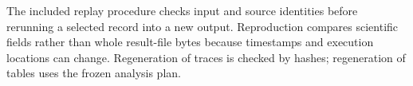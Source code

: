 \documentclass[11pt,a4paper]{article}
\begin{document}
The included replay procedure checks input and source identities before rerunning a selected record into a new output. Reproduction compares scientific fields rather than whole result-file bytes because timestamps and execution locations can change. Regeneration of traces is checked by hashes; regeneration of tables uses the frozen analysis plan.
\end{document}
